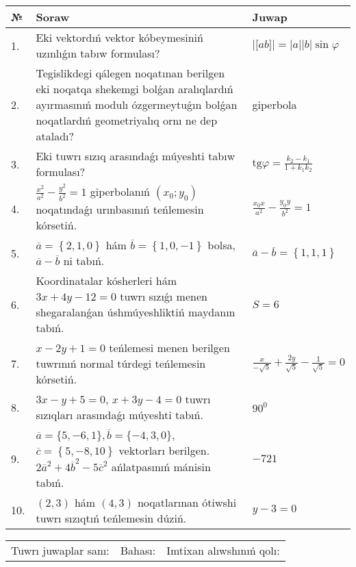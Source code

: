 \documentclass{article}
\begin{document}
\begin{tabular}{|m{0.7cm}|m{10cm}|m{4cm}|}
\hline
№ & Soraw & Juwap \\
\hline
1. & Eki vektordıń vektor kóbeymesiniń uzınlıǵın tabıw formulası? & $\left| \lbrack ab\rbrack \right|=|a||b|\sin\varphi$ \\
\hline
2. & Tegislikdegi qálegen noqatınan berilgen eki noqatqa shekemgi bolǵan aralıqlardıń ayırmasınıń modulı ózgermeytuǵın bolǵan noqatlardıń geometriyalıq ornı ne dep ataladı? & giperbola \\
\hline
3. & Eki tuwrı sızıq arasındaǵı múyeshti tabıw formulası? & $\text{tg}\varphi=\frac{k_2-k_1}{1+k_1k_2}$ \\
\hline
4. & $\frac{x^2}{a^2}-\frac{y^2}{b^2}=1$ giperbolanıń $(x_0;y_0)$ noqatındaǵı urınbasınıń teńlemesin kórsetiń. & $\frac{x_0x}{a^2}-\frac{y_0y}{b^2}=1$ \\
\hline
5. & $\overline{a}=\left\{ 2, 1, 0 \right\}$ hám $\overline{b}=\left\{ 1, 0,-1 \right\}$ bolsa, $\overline{a}-\overline{b}$ ni tabıń. & $\overline{a} -\overline{b} = \left\{ 1,1,1 \right\}$ \\
\hline
6. & Koordinatalar kósherleri hám $ 3x+4y-12=0 $ tuwrı sızıǵı menen shegaralanǵan úshmúyeshliktiń maydanın tabıń. & $ S=6 $ \\
\hline
7. & $x-2y+1=0$ teńlemesi menen berilgen tuwrınıń normal túrdegi teńlemesin kórsetiń. & $\frac{x}{- \sqrt{5}}+\frac{2y}{\sqrt{5}}-\frac{1}{\sqrt{5}}=0$ \\
\hline
8. & $3x-y+5=0$, $x+3y-4=0$ tuwrı sızıqları arasındaǵı múyeshti tabıń. & $90^{0}$ \\
\hline
9. & $\overline{a}=\{5,-6, 1 \}, \overline{b}=\{-4, 3, 0 \} $, $\overline{c}=\left\{ 5,-8, 10 \right\}$ vektorları berilgen. $2{\overline{a}}^{2}+4{\overline{b}}^{2}-5{\overline{c}}^{2}$ ańlatpasınıń mánisin tabıń. & $-721$ \\
\hline
10. & $(2, 3)$ hám $(4, 3)$ noqatlarınan ótiwshi tuwrı sızıqtıń teńlemesin dúziń. & $ y-3=0$ \\
\hline
\end{tabular}

\vspace{1cm}

\begin{tabular}{lll}
Tuwrı juwaplar sanı: \underline{\hspace{1.5cm}} & 
Bahası: \underline{\hspace{1.5cm}} & 
Imtixan alıwshınıń qolı: \underline{\hspace{2cm}} \\
\end{tabular}
\end{document}
